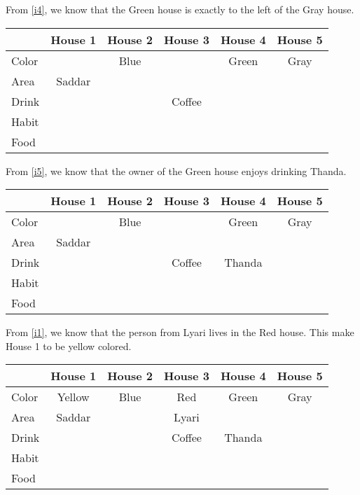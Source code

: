 \documentclass[a4paper]{exam}
\newcommand\cb{\color{blue}}
\begin{document}
\begin{questions}
\begin{solution}
    From \ref{i4}, we know that the Green house is exactly to the left of the Gray house.\\
    \begin{tabular}{l||*5{c|}}
      & \textbf{House 1} & \textbf{\cb House 2} & \textbf{House 3} & \textbf{House 4} & \textbf{House 5} \\
      \hline\hline
      Color & & Blue & & Green & Gray\\\hline
      Area & Saddar & & & & \\\hline
      Drink & & &Coffee & & \\\hline
      Habit & & & & & \\\hline
      Food & & & & & \\\hline
      \end{tabular}
      
     From \ref{i5}, we know that the owner of the Green house enjoys drinking Thanda.\\
    \begin{tabular}{l||*5{c|}}
      & \textbf{House 1} & \textbf{\cb House 2} & \textbf{House 3} & \textbf{House 4} & \textbf{House 5} \\
      \hline\hline
      Color & & Blue & & Green & Gray\\\hline
      Area & Saddar & & & & \\\hline
      Drink & & &Coffee & Thanda & \\\hline
      Habit & & & & & \\\hline
      Food & & & & & \\\hline
      \end{tabular}

        From \ref{i1}, we know that the person from Lyari lives in the Red house. This make House 1 to be yellow colored. \\
    \begin{tabular}{l||*5{c|}}
      & \textbf{House 1} & \textbf{\cb House 2} & \textbf{House 3} & \textbf{House 4} & \textbf{House 5} \\
      \hline\hline
      Color & Yellow & Blue & Red& Green & Gray\\\hline
      Area & Saddar & & Lyari & & \\\hline
      Drink & & &Coffee & Thanda & \\\hline
      Habit & & & & & \\\hline
      Food & & & & & \\\hline
      \end{tabular}


\end{solution}
\end{questions}
\end{document}
